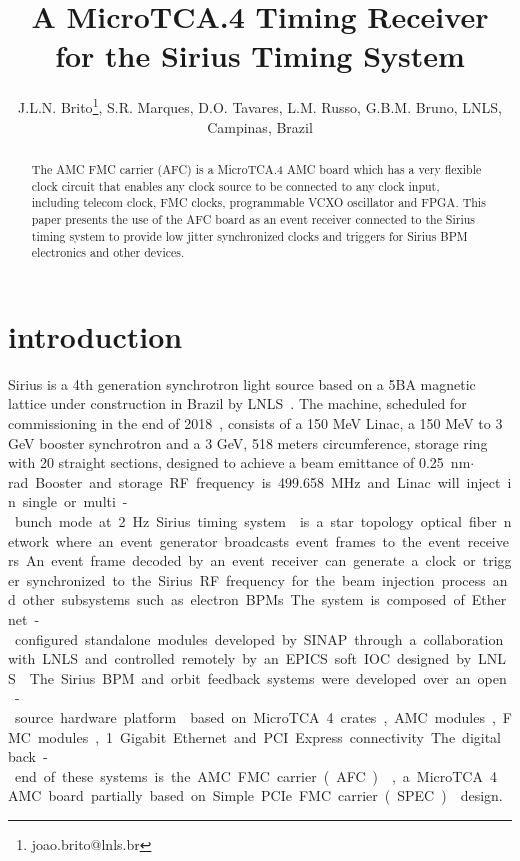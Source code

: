 \documentclass[a4paper,
               biblatex,      %
               ]{jacow}
\begin{document}
\title{A MicroTCA.4  Timing Receiver for the Sirius Timing System}

\author{J.L.N. Brito\thanks{joao.brito@lnls.br}, S.R. Marques, D.O. Tavares, L.M. Russo, G.B.M. Bruno, LNLS, Campinas, Brazil}
	
\maketitle

%
\begin{abstract}
   The AMC FMC carrier (AFC) is a MicroTCA.4 AMC board which has a very flexible clock circuit that enables any clock source to be connected to any clock input, including telecom clock, FMC clocks, programmable VCXO oscillator and FPGA. This paper presents the use of the AFC board as an event receiver connected to the Sirius timing system to provide low jitter synchronized clocks and triggers for Sirius BPM electronics and other devices.
\end{abstract}


\section{introduction}
Sirius is a 4th  generation  synchrotron light source  based  on  a 5BA magnetic lattice under construction in Brazil by LNLS~\cite{sirius_ipac16}. The machine, scheduled for commissioning in the end of 2018~\cite{rodrigues2016sirius}, consists of a 150 MeV Linac, a 150 MeV to 3 GeV booster synchrotron and a 3 GeV, 518 meters circumference, storage ring with 20 straight sections, designed to achieve a beam emittance of \SI{0.25}{nm$\cdot$rad}. Booster and storage RF frequency is \SI{499.658}{MHz} and Linac will inject in single or multi-bunch mode at \SI{2}{Hz}.

Sirius timing system~\cite{timing_icalepcs15} is a star topology optical fiber network where an event generator broadcasts event frames to the event receivers. An event frame decoded by an event receiver can generate a clock or trigger synchronized to the Sirius RF frequency for the beam injection process and other subsystems such as electron BPMs. The system is composed of Ethernet-configured standalone modules developed by SINAP through a collaboration with LNLS and controlled remotely by an EPICS soft IOC designed by LNLS~\cite{sinap-timing-epics-ioc}.

The Sirius BPM and orbit feedback systems were developed over an open-source hardware platform~\cite{ebpm_icalepcs13} based on MicroTCA.4 crates, AMC modules, FMC modules, 1 Gigabit Ethernet and PCI Express connectivity. The digital back-end of these systems is the AMC FMC carrier (AFC)~\cite{afc-git}, a MicroTCA.4 AMC board partially based on Simple PCIe FMC carrier (SPEC)~\cite{spec} design. 
\end{document}
